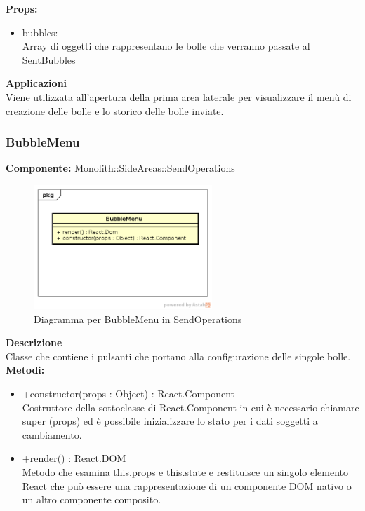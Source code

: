 \textbf{Props:} 
\begin{itemize}
\item bubbles: 
\\
Array di oggetti che rappresentano le bolle che verranno passate al SentBubbles

\end{itemize} 


\textbf{Applicazioni}\\
Viene utilizzata all'apertura della prima area laterale per visualizzare il menù di creazione delle bolle e lo storico delle bolle inviate. 


\clearpage

\subsubsection{BubbleMenu}
\textbf{Componente:}  Monolith::SideAreas::SendOperations\\
   \FloatBarrier
   \begin{figure}[ht]
   \centering
   \includegraphics[width=0.6\textwidth]{img/single-BubbleMenu.png}
   \caption{{Diagramma per BubbleMenu in SendOperations}}
\end{figure}
\FloatBarrier
\textbf{Descrizione}\\
Classe che contiene i pulsanti che portano alla configurazione delle singole bolle.
\textbf{Metodi:} 
\begin{itemize}
\item +constructor(props : Object) : React.Component 
\\
Costruttore della sottoclasse di React.Component in cui è necessario chiamare super (props) ed è possibile inizializzare lo stato per i dati soggetti a cambiamento.
\item +render() : React.DOM 
\\
Metodo che esamina this.props e this.state e restituisce un singolo elemento React che può essere una rappresentazione di un componente DOM nativo o un altro componente composito.
\end{itemize}

